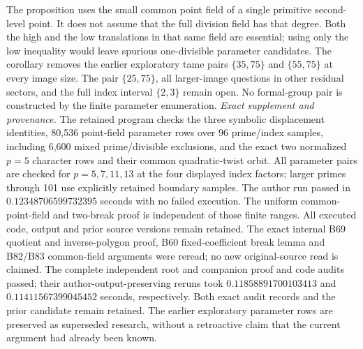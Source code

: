 \begin{remark}
\label{rem:B-RD84-scope}
The proposition uses the small common point field of a
single primitive second-level point. It does not assume
that the full division field has that degree. Both the
high and the low translations in that same field are
essential; using only the low inequality would leave
spurious one-divisible parameter candidates.
The corollary removes the earlier exploratory tame pairs
\(\{35,75\}\) and \(\{55,75\}\) at every image size.
The pair \(\{25,75\}\), all larger-image questions in
other residual sectors, and the full index interval
\(\{2,3\}\) remain open. No formal-group pair is
constructed by the finite parameter enumeration.
\smallskip
\noindent\emph{Exact supplement and provenance.}
The retained program
checks the three symbolic displacement identities,
80,536 point-field parameter rows over 96 prime/index
samples, including 6,600 mixed prime/divisible exclusions,
and the exact two normalized \(p=5\) character rows and
their common quadratic-twist orbit. All parameter pairs
are checked for \(p=5,7,11,13\) at the four displayed
index factors; larger primes through 101 use explicitly
retained boundary samples. The author run passed in
\(0.12348706599732395\) seconds with no failed execution.
The uniform common-point-field and two-break proof is
independent of those finite ranges. All executed code,
output and prior source versions remain retained.
The exact internal B69 quotient and inverse-polygon proof,
B60 fixed-coefficient break lemma and B82/B83 common-field
arguments were reread; no new original-source read is
claimed.
The complete independent root and companion proof and code
audits passed; their author-output-preserving reruns took
\(0.11858891700103413\) and
\(0.11411567399045452\) seconds, respectively.
Both exact audit records and the prior candidate remain
retained. The earlier exploratory parameter rows are
preserved as superseded research, without a retroactive
claim that the current argument had already been known.
\end{remark}
